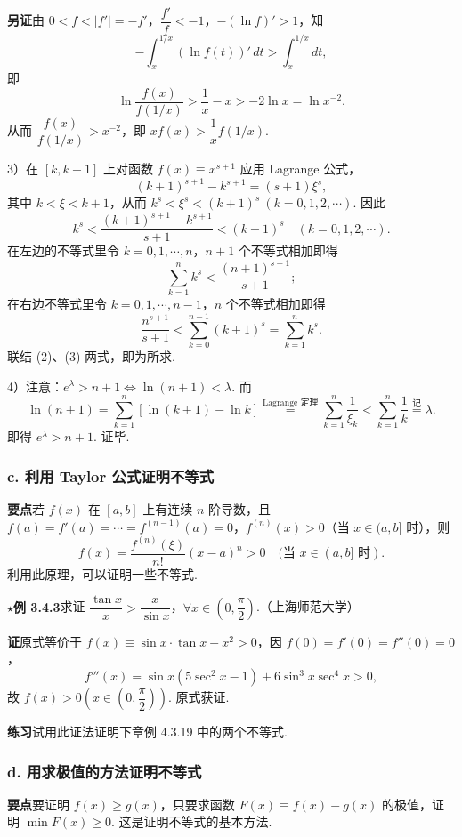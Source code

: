 \documentclass[UTF8, 12pt, fontset=fandol, oneside]{ctexart}
\begin{document}
\noindent\textbf{另证}\quad 由 $0<f<|f'|=-f'$，$\dfrac{f'}f<-1$，$-(\ln f)'>1$，知
\[
  -\int_x^{1/x}(\ln f(t))'\,dt>\int_x^{1/x}dt,
\]
即
\[
  \ln\frac{f(x)}{f(1/x)}>\frac1x-x>-2\ln x=\ln x^{-2}.
\]
从而 $\dfrac{f(x)}{f(1/x)}>x^{-2}$，即 $xf(x)>\dfrac1x f(1/x)$.

3）在 $[k,k+1]$ 上对函数 $f(x)\equiv x^{s+1}$ 应用 Lagrange 公式，
\[
  (k+1)^{s+1}-k^{s+1}=(s+1)\xi^s,
\]
其中 $k<\xi<k+1$，从而 $k^s<\xi^s<(k+1)^s\ (k=0,1,2,\cdots)$. 因此
\[
  k^s<\frac{(k+1)^{s+1}-k^{s+1}}{s+1}<(k+1)^s\quad(k=0,1,2,\cdots). \tag{1}
\]
在左边的不等式里令 $k=0,1,\cdots,n$，$n+1$ 个不等式相加即得
\[
  \sum_{k=1}^n k^s<\frac{(n+1)^{s+1}}{s+1}; \tag{2}
\]
在右边不等式里令 $k=0,1,\cdots,n-1$，$n$ 个不等式相加即得
\[
  \frac{n^{s+1}}{s+1}<\sum_{k=0}^{n-1}(k+1)^s=\sum_{k=1}^n k^s. \tag{3}
\]
联结 (2)、(3) 两式，即为所求.

4）注意：$e^\lambda>n+1\Leftrightarrow \ln(n+1)<\lambda$. 而
\[
  \ln(n+1)=\sum_{k=1}^n[\ln(k+1)-\ln k]
  \overset{\text{Lagrange 定理}}{=}\sum_{k=1}^n\frac1{\xi_k}
  <\sum_{k=1}^n\frac1k\overset{\text{记}}{=}\lambda.
\]
即得 $e^\lambda>n+1$. 证毕.

\subsubsection*{c. 利用 Taylor 公式证明不等式}

\noindent\textbf{要点}\quad 若 $f(x)$ 在 $[a,b]$ 上有连续 $n$ 阶导数，且 $f(a)=f'(a)=\cdots=f^{(n-1)}(a)=0$，$f^{(n)}(x)>0$（当 $x\in(a,b]$ 时），则
\[
  f(x)=\frac{f^{(n)}(\xi)}{n!}(x-a)^n>0\quad(\text{当 }x\in(a,b]\text{ 时}).
\]
利用此原理，可以证明一些不等式.

\noindent\textbf{$\star$例 3.4.3}\quad 求证 $\dfrac{\tan x}{x}>\dfrac{x}{\sin x}$，$\forall x\in\left(0,\dfrac\pi2\right)$.（上海师范大学）

\noindent\textbf{证}\quad 原式等价于 $f(x)\equiv \sin x\cdot\tan x-x^2>0$，因 $f(0)=f'(0)=f''(0)=0$，
\[
  f'''(x)=\sin x(5\sec^2x-1)+6\sin^3x\sec^4x>0,
\]
故 $f(x)>0\left(x\in\left(0,\dfrac\pi2\right)\right)$. 原式获证.

\noindent\textbf{练习}\quad 试用此证法证明下章例 4.3.19 中的两个不等式.

\subsubsection*{d. 用求极值的方法证明不等式}

\noindent\textbf{要点}\quad 要证明 $f(x)\ge g(x)$，只要求函数 $F(x)\equiv f(x)-g(x)$ 的极值，证明 $\min F(x)\ge0$. 这是证明不等式的基本方法.
\end{document}
